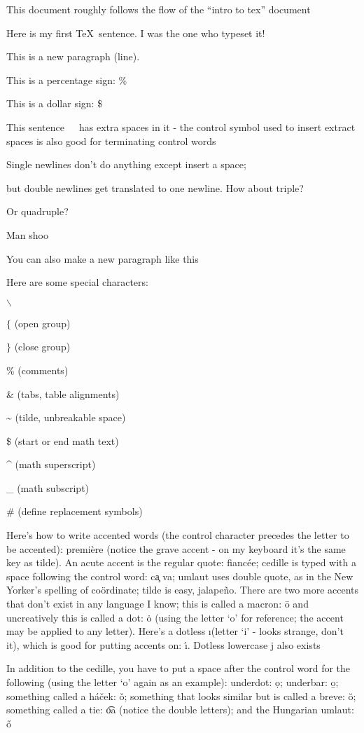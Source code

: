 \nopagenumbers
This document roughly follows the flow of the ``intro to tex'' document

Here is my first \TeX\ sentence.
I was the one who typeset it!

This is a new paragraph (line).

This is a percentage sign: \%

This is a dollar sign: \$

This sentence\ \ \ has extra spaces in it - the control symbol used to
insert extract spaces is also good for
terminating control words

Single newlines
don't do anything except insert a space;

but double newlines get translated to one newline. How about triple?


Or quadruple?



Man shoo
\par You can also make a new paragraph like this

Here are some special characters: 

$\backslash$

$\{$ (open group)

$\}$ (close group)

\% (comments)

\& (tabs, table alignments)

\~{} (tilde, unbreakable space)

\$ (start or end math text)

\^{} (math superscript)

\_{} (math subscript)

\# (define replacement symbols)

Here's how to write accented words (the control character precedes the
letter to be accented): premi\`ere (notice the grave accent -
on my keyboard it's the same key as tilde). An acute accent is the regular
quote: fianc\'ee; cedille is typed with a space following the control word: 
c\c a va; umlaut uses double
quote, as in the New Yorker's spelling of co\"ordinate; tilde is easy,
jalape\~no. There are two more accents that don't exist in any language I know; this
is called a macron: \=o and uncreatively this is called a dot: \.o (using
the letter `o' for reference; the accent may be applied to any letter).
Here's a dotless \i (letter `i' - looks strange, don't it), which is good 
for putting accents on: \'\i. Dotless lowercase j also exists

In addition to the cedille, you have to put a space after the control word
for the following (using the letter `o' again as an example):
underdot: \d o; underbar: \b o; something called a h\'a\v cek: \v o;
something that looks similar but is called a breve: \u o;
something called a tie: \t oa (notice the double letters); and the Hungarian
umlaut: \H o

